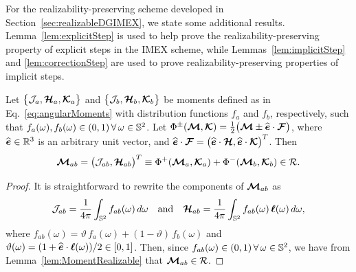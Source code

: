 For the realizability-preserving scheme developed in Section~\ref{sec:realizableDGIMEX}, we state some additional results.  
Lemma~\ref{lem:explicitStep} is used to help prove the realizability-preserving property of explicit steps in the IMEX scheme, while Lemmas~\ref{lem:implicitStep} and \ref{lem:correctionStep} are used to prove realizability-preserving properties of implicit steps.  
\begin{lemma}
  Let $\big\{\mathcal{J}_{a},\boldsymbol{\mathcal{H}}_{a},\boldsymbol{\mathcal{K}}_{a}\big\}$ and $\big\{\mathcal{J}_{b},\boldsymbol{\mathcal{H}}_{b},\boldsymbol{\mathcal{K}}_{b}\big\}$ be moments defined as in Eq.~\eqref{eq:angularMoments} with distribution functions $f_{a}$ and $f_{b}$, respectively, such that $f_{a}(\omega),f_{b}(\omega)\in(0,1)\,\forall\,\omega\in\mathbb{S}^{2}$.  
  Let $\Phi^{\pm}(\boldsymbol{\mathcal{M}},\boldsymbol{\mathcal{K}})=\frac{1}{2}\big(\boldsymbol{\mathcal{M}}\pm\widehat{\boldsymbol{e}}\cdot\boldsymbol{\mathcal{F}}\big)$, where $\widehat{\boldsymbol{e}}\in\mathbb{R}^{3}$ is an arbitrary unit vector, and $\widehat{\boldsymbol{e}}\cdot\boldsymbol{\mathcal{F}}=\big(\widehat{\boldsymbol{e}}\cdot\boldsymbol{\mathcal{H}},\widehat{\boldsymbol{e}}\cdot\boldsymbol{\mathcal{K}}\big)^{T}$.  
  Then
  \begin{equation*}
    \boldsymbol{\mathcal{M}}_{ab} = \big(\mathcal{J}_{ab},\boldsymbol{\mathcal{H}}_{ab}\big)^{T} \equiv \Phi^{+}(\boldsymbol{\mathcal{M}}_{a},\boldsymbol{\mathcal{K}}_{a})+\Phi^{-}(\boldsymbol{\mathcal{M}}_{b},\boldsymbol{\mathcal{K}}_{b})\in\mathcal{R}.
  \end{equation*}
  \label{lem:explicitStep}
\end{lemma}
\begin{proof}
  It is straightforward to rewrite the components of $\boldsymbol{\mathcal{M}}_{ab}$ as
  \begin{equation*}
    \mathcal{J}_{ab}=\frac{1}{4\pi}\int_{\mathbb{S}^{2}}f_{ab}(\omega)\,d\omega
    \quad\text{and}\quad
    \boldsymbol{\mathcal{H}}_{ab}=\frac{1}{4\pi}\int_{\mathbb{S}^{2}}f_{ab}(\omega)\,\boldsymbol{\ell}(\omega)\,d\omega,
  \end{equation*}
  where $f_{ab}(\omega)=\vartheta\,f_{a}(\omega)+(1-\vartheta)\,f_{b}(\omega)$ and $\vartheta(\omega)=(1+\widehat{\boldsymbol{e}}\cdot\boldsymbol{\ell}(\omega))/2\in[0,1]$.  
  Then, since $f_{ab}(\omega)\in(0,1)\,\forall\,\omega\in\mathbb{S}^{2}$, we have from Lemma~\ref{lem:MomentRealizable} that $\boldsymbol{\mathcal{M}}_{ab}\in\mathcal{R}$.  
\end{proof}

